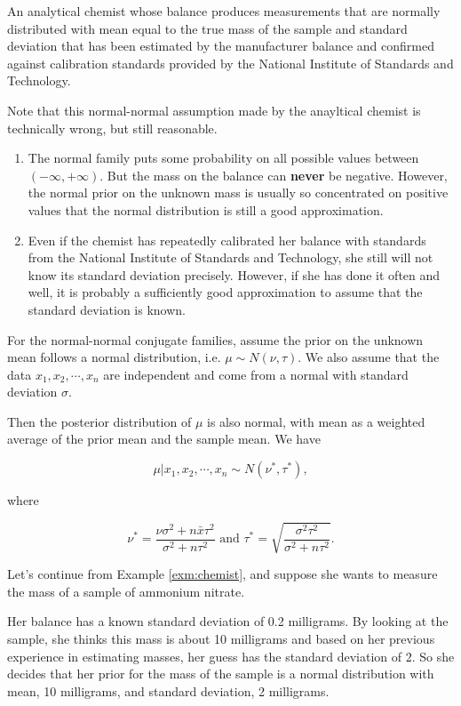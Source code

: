 \documentclass[]{book}
\theoremstyle{definition}
\theoremstyle{definition}
\theoremstyle{definition}
\theoremstyle{remark}
\let\BeginKnitrBlock\begin \let\EndKnitrBlock\end
\begin{document}
\BeginKnitrBlock{example}
\protect\hypertarget{exm:chemist}{}{\label{exm:chemist} }An analytical
chemist whose balance produces measurements that are normally
distributed with mean equal to the true mass of the sample and standard
deviation that has been estimated by the manufacturer balance and
confirmed against calibration standards provided by the National
Institute of Standards and Technology.

Note that this normal-normal assumption made by the anayltical chemist
is technically wrong, but still reasonable.

\begin{enumerate}
\def\labelenumi{\arabic{enumi}.}
\item
  The normal family puts some probability on all possible values between
  \((-\infty,+\infty)\). But the mass on the balance can \textbf{never}
  be negative. However, the normal prior on the unknown mass is usually
  so concentrated on positive values that the normal distribution is
  still a good approximation.
\item
  Even if the chemist has repeatedly calibrated her balance with
  standards from the National Institute of Standards and Technology, she
  still will not know its standard deviation precisely. However, if she
  has done it often and well, it is probably a sufficiently good
  approximation to assume that the standard deviation is known.
\end{enumerate}
\EndKnitrBlock{example}

For the normal-normal conjugate families, assume the prior on the
unknown mean follows a normal distribution, i.e.
\(\mu \sim N(\nu, \tau)\). We also assume that the data
\(x_1,x_2,\cdots,x_n\) are independent and come from a normal with
standard deviation \(\sigma\).

Then the posterior distribution of \(\mu\) is also normal, with mean as
a weighted average of the prior mean and the sample mean. We have

\[\mu|x_1,x_2,\cdots,x_n \sim N(\nu^*, \tau^*),\]

where

\[\nu^* = \frac{\nu\sigma^2 + n\bar{x}\tau^2}{\sigma^2 + n\tau^2} \text{ and } \tau^* = \sqrt{\frac{\sigma^2\tau^2}{\sigma^2 + n\tau^2}}.\]

Let's continue from Example \ref{exm:chemist}, and suppose she wants to
measure the mass of a sample of ammonium nitrate.

Her balance has a known standard deviation of 0.2 milligrams. By looking
at the sample, she thinks this mass is about 10 milligrams and based on
her previous experience in estimating masses, her guess has the standard
deviation of 2. So she decides that her prior for the mass of the sample
is a normal distribution with mean, 10 milligrams, and standard
deviation, 2 milligrams.
\end{document}
